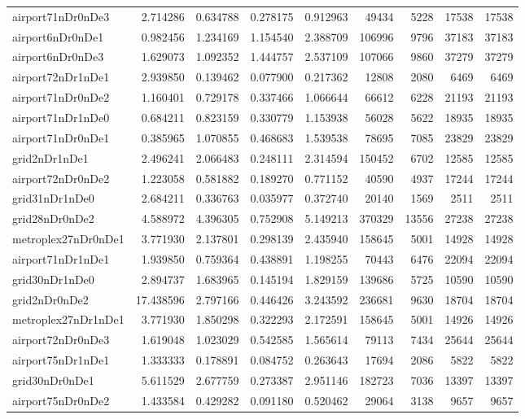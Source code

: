 \begin{longtable}{|l|r|r|r|r|r|r|r|r|}
airport71nDr0nDe3 & 2.714286 & 0.634788 & 0.278175 & 0.912963 & 49434 & 5228 & 17538 & 17538 \\
airport6nDr0nDe1 & 0.982456 & 1.234169 & 1.154540 & 2.388709 & 106996 & 9796 & 37183 & 37183 \\
airport6nDr0nDe3 & 1.629073 & 1.092352 & 1.444757 & 2.537109 & 107066 & 9860 & 37279 & 37279 \\
airport72nDr1nDe1 & 2.939850 & 0.139462 & 0.077900 & 0.217362 & 12808 & 2080 & 6469 & 6469 \\
airport71nDr0nDe2 & 1.160401 & 0.729178 & 0.337466 & 1.066644 & 66612 & 6228 & 21193 & 21193 \\
airport71nDr1nDe0 & 0.684211 & 0.823159 & 0.330779 & 1.153938 & 56028 & 5622 & 18935 & 18935 \\
airport71nDr0nDe1 & 0.385965 & 1.070855 & 0.468683 & 1.539538 & 78695 & 7085 & 23829 & 23829 \\
grid2nDr1nDe1 & 2.496241 & 2.066483 & 0.248111 & 2.314594 & 150452 & 6702 & 12585 & 12585 \\
airport72nDr0nDe2 & 1.223058 & 0.581882 & 0.189270 & 0.771152 & 40590 & 4937 & 17244 & 17244 \\
grid31nDr1nDe0 & 2.684211 & 0.336763 & 0.035977 & 0.372740 & 20140 & 1569 & 2511 & 2511 \\
grid28nDr0nDe2 & 4.588972 & 4.396305 & 0.752908 & 5.149213 & 370329 & 13556 & 27238 & 27238 \\
metroplex27nDr0nDe1 & 3.771930 & 2.137801 & 0.298139 & 2.435940 & 158645 & 5001 & 14928 & 14928 \\
airport71nDr1nDe1 & 1.939850 & 0.759364 & 0.438891 & 1.198255 & 70443 & 6476 & 22094 & 22094 \\
grid30nDr1nDe0 & 2.894737 & 1.683965 & 0.145194 & 1.829159 & 139686 & 5725 & 10590 & 10590 \\
grid2nDr0nDe2 & 17.438596 & 2.797166 & 0.446426 & 3.243592 & 236681 & 9630 & 18704 & 18704 \\
metroplex27nDr1nDe1 & 3.771930 & 1.850298 & 0.322293 & 2.172591 & 158645 & 5001 & 14926 & 14926 \\
airport72nDr0nDe3 & 1.619048 & 1.023029 & 0.542585 & 1.565614 & 79113 & 7434 & 25644 & 25644 \\
airport75nDr1nDe1 & 1.333333 & 0.178891 & 0.084752 & 0.263643 & 17694 & 2086 & 5822 & 5822 \\
grid30nDr0nDe1 & 5.611529 & 2.677759 & 0.273387 & 2.951146 & 182723 & 7036 & 13397 & 13397 \\
airport75nDr0nDe2 & 1.433584 & 0.429282 & 0.091180 & 0.520462 & 29064 & 3138 & 9657 & 9657 \\

\end{longtable}
